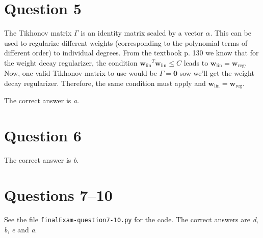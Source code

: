 \documentclass[	11pt,
				a4paper,
				twoside,
				titlepage,
				bibtotoc,
				openright,
				cleardoublepage=empty
				]{scrartcl}
\begin{document}
\section{Question 5} %
The Tikhonov matrix $\Gamma$ is an identity matrix scaled by a vector $\alpha$. This can be used to regularize different weights (corresponding to the polynomial terms of different order) to individual degrees.
From the textbook p. 130 we know that for the weight decay regularizer, the condition $\mathbf{w}_{\text{lin}}{}^T\mathbf{w}_{\text{lin}} \leq C$ leads to $\mathbf{w}_{\text{lin}} = \mathbf{w}_{\text{reg}}$. Now, one valid Tikhonov matrix to use would be $\Gamma = \mathbf{0}$ sow we'll get the weight decay regularizer. Therefore, the same condition must apply and $\mathbf{w}_{\text{lin}} = \mathbf{w}_{\text{reg}}$.

The correct answer is \emph{a}.
\vspace{\baselineskip}




\section{Question 6} %
The correct answer is \emph{b}.
\vspace{\baselineskip}



\section{Questions 7--10} %
See the file \verb|finalExam-question7-10.py| for the code. The correct answers are \emph{d}, \emph{b}, \emph{e} and \emph{a}.
\vspace{\baselineskip}
\end{document}

